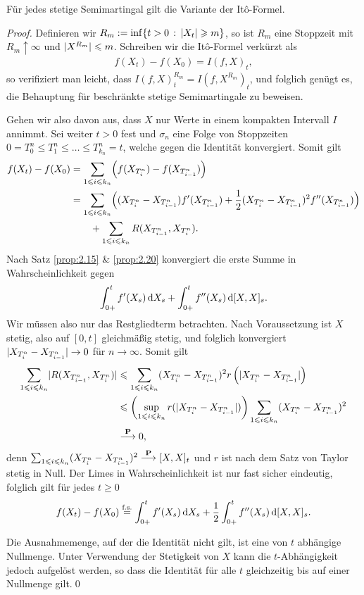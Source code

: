 \begin{prop*}[Proposition A]
Für jedes stetige Semimartingal gilt die Variante der Itô-Formel.\fish
\end{prop*}
\begin{proof}
Definieren wir $R_m \defl \inf\setdef{t > 0}{\abs{X_t}\ge m}$, so ist $R_m$ eine
Stoppzeit mit $R_m\uparrow \infty$ und $\abs{X^{R_m}}\le m$. Schreiben wir die
Itô-Formel verkürzt als
\begin{align*}
f(X_t)-f(X_0) = I(f,X)_t,
\end{align*}
so verifiziert man leicht, dass $I(f,X)_t^{R_m} = I(f,X^{R_m})_t$, und folglich
genügt es, die Behauptung für beschränkte stetige Semimartingale zu beweisen.

Gehen wir also davon aus, dass $X$ nur Werte in einem kompakten Intervall $I$
annimmt. Sei weiter $t > 0$ fest und $\sigma_n$ eine Folge von Stoppzeiten
$0 = T_0^n \le T_1^n \le \ldots \le T_{k_n}^n = t$, welche gegen die
Identität konvergiert. Somit gilt
\begin{align*}
f(X_t)-f(X_0) &= 
\sum_{1\le i\le k_n} \Bigl(f(X_{T_{i}^n}) - f(X_{T_{i-1}^n})\Bigr)\\
&=
\sum_{1\le i\le k_n}
\Bigl( 
(X_{T_i^n}-X_{T_{i-1}^n})f'(X_{T_{i-1}^n})
+
\frac{1}{2}(X_{T_i^n}-X_{T_{i-1}^n})^2f''(X_{T_{i-1}^n})\Bigr)\\
&\qquad+\sum_{1\le i\le k_n} R(X_{T_{i-1}^n},X_{T_i^n}).
\end{align*}
Nach Satz \ref{prop:2.15} \& \ref{prop:2.20} konvergiert die erste Summe in
Wahrscheinlichkeit gegen
\begin{align*}
\int_{0+}^t f'(X_s) \dX_s + \int_{0+}^t f''(X_s)\,\diffd[X,X]_s.
\end{align*}
Wir müssen also nur das Restgliedterm betrachten. Nach Voraussetzung ist $X$
stetig, also auf $[0,t]$ gleichmäßig stetig, und folglich konvergiert
$\abs{X_{T_{i}^n}-X_{T_{i-1}^n}} \to 0$ \fs für $n\to \infty$. Somit gilt
\begin{align*}
\sum_{1\le i\le k_n}
\abs{R(X_{T_{i-1}^n},X_{T_i^n})} &\le \sum_{1\le i\le
k_n} (X_{T_i^n}-X_{T_{i-1}^n})^2 r\left(\abs{X_{T_i^n}-X_{T_{i-1}^n}} \right)\\
&\le
\biggl( \sup_{1\le i\le k_n}r(\abs{X_{T_i^n}-X_{T_{i-1}^n}})\biggr)
\sum_{1\le i\le
k_n} (X_{T_i^n}-X_{T_{i-1}^n})^2\\
&\Pto 0,
\end{align*}
denn $\sum_{1\le i\le
k_n} (X_{T_i^n}-X_{T_{i-1}^n})^2\Pto [X,X]_t$ und $r$ ist nach dem Satz von
Taylor stetig in Null. Der Limes in Wahrscheinlichkeit ist nur fast sicher eindeutig, folglich gilt für jedes $t\ge 0$
\begin{align*}
f(X_t) - f(X_0) \overset{\fs}{=} \int_{0+}^t f'(X_s)\dX_s 
+ \frac{1}{2}\int_{0+}^t f''(X_s)\,\diffd[X,X]_s.
\end{align*}

Die Ausnahmemenge, auf der die Identität nicht gilt, ist eine von $t$ abhängige
Nullmenge. Unter Verwendung der Stetigkeit von $X$ kann die $t$-Abhängigkeit
jedoch aufgelöst werden, so dass die Identität für alle $t$ gleichzeitig bis
auf einer Nullmenge gilt.\qed
\end{proof}

